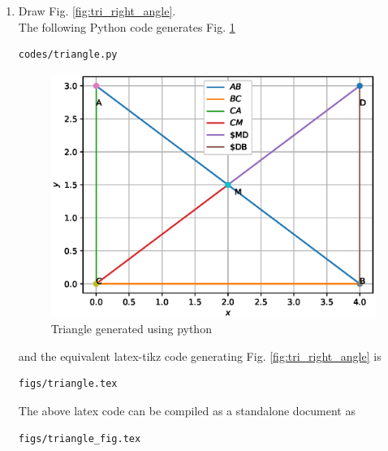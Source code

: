 \begin{enumerate}[label=\thesection.\arabic*.,ref=\thesection.\theenumi]
\begin{table}[ht!]
\end{table}
%
\item Draw Fig. \ref{fig:tri_right_angle}.	
\\
\solution The  following Python code generates Fig. \ref{fig:tri_sss_py}
%
\begin{lstlisting}
codes/triangle.py
\end{lstlisting}
\begin{figure}[!ht]
\centering
\includegraphics[width=\columnwidth]{./figs/triangle.eps}
\caption{Triangle generated using python}
\label{fig:tri_sss_py}
\end{figure}

%
and the equivalent latex-tikz code generating Fig. \ref{fig:tri_right_angle} is 
\begin{lstlisting}
figs/triangle.tex
\end{lstlisting}
%
The above latex code can be compiled as a standalone document as
\begin{lstlisting}
figs/triangle_fig.tex
\end{lstlisting}

%

%

%
%

\end{enumerate}
